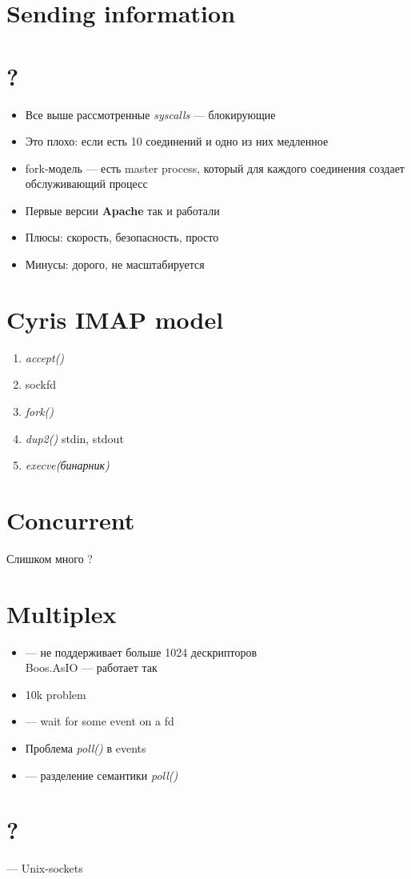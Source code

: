 
\section{Sending information}

\section{?}
\begin{itemize}
    \item Все выше рассмотренные \emph{syscalls} --- блокирующие
    \item Это плохо: если есть 10 соединений и одно из них медленное
    \item fork-модель --- есть master process, который для каждого соединения
          создает обслуживающий процесс
    \item Первые версии \textbf{Apache} так и работали
    \item Плюсы: скорость, безопасность, просто
    \item Минусы: дорого, не масштабируется
\end{itemize}

\section{Cyris IMAP model}
\begin{enumerate}
    \item \emph{accept()}
    \item sockfd
    \item \emph{fork()}
    \item \emph{dup2()} stdin, stdout
    \item \emph{execve(бинарник)}
\end{enumerate}

\section{Concurrent}
Слишком много ?

\section{Multiplex}
\begin{itemize}
    \item {} --- не поддерживает больше 1024 дескрипторов\\
          Boos.AsIO --- работает так
    \item 10k problem
    \item {} --- wait for some event on a fd
    \item Проблема \emph{poll()} в events
    \item {} --- разделение семантики \emph{poll()}
\end{itemize}

\section{?}
 --- Unix-sockets
